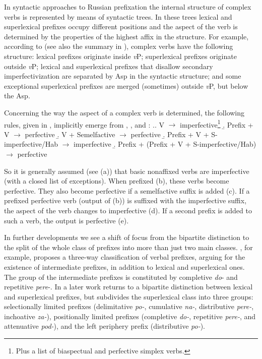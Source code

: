 In syntactic approaches to Russian prefixation the internal structure of complex verbs is represented by means of syntactic trees. In these trees lexical and superlexical prefixes occupy different positions and the aspect of the verb is determined by the properties of the highest affix in the structure. For example, according to \citealt{Svenonius:04b} (see also the summary in \citealt{Svenonius:12}), complex verbs have the following structure: lexical prefixes originate inside \textit{v}P; superlexical prefixes originate outside \textit{v}P; lexical and superlexical prefixes that disallow secondary imperfectivization are separated by Asp in the syntactic structure; and some exceptional superlexical prefixes are merged (sometimes) outside \textit{v}P, but below the Asp.

Concerning the way the aspect of a complex verb is determined, the following rules, given in \cite{Borer:13}, implicitly emerge from \citet{Ramchand:04}, \citet{Romanova:04}, and \citet{Svenonius:04b}:
\ex.\label{bor}\a. V $\rightarrow$ {imperfective}\footnote{Plus a list of biaspectual and perfective simplex verbs.}
\b. Prefix + V $\rightarrow$ {perfective}
\b. V + Semelfactive $\rightarrow$ {perfective}
\b. Prefix + V + S-imperfective/Hab $\rightarrow$ {imperfective}
\b. Prefix + (Prefix + V + S-imperfective/Hab) $\rightarrow$ {perfective}

So it is generally assumed (see (a)) that basic nonaffixed verbs are imperfective (with a closed list of exceptions). When prefixed (b), these verbs become perfective. They also become perfective if a semelfactive suffix is added (c). If a prefixed perfective verb (output of (b)) is suffixed with the imperfective suffix, the aspect of the verb changes to imperfective (d). If a second prefix is added to such a verb, the output is perfective (e).

In further developments we see a shift of focus from the bipartite distinction to the split of the whole class of prefixes into more than just two main classes. \citet{Tatevosov:07}, for example, proposes a three-way classification of verbal prefixes, arguing for the existence of intermediate prefixes, in addition to lexical and superlexical ones. The group of the intermediate prefixes is constituted by completive \textit{do}- and repetitive \textit{pere}-. In a later work \citet{Tatevosov:09} returns to a bipartite distinction between lexical and superlexical prefixes, but subdivides the superlexical class into three groups: selectionally limited prefixes (delimitative \textit{po-}, cumulative \textit{na-}, distributive \textit{pere-}, inchoative \textit{za-}), positionally limited prefixes (completive \textit{do-}, repetitive \textit{pere-}, and attenuative \textit{pod-}), and the left periphery prefix (distributive \textit{po-}).

